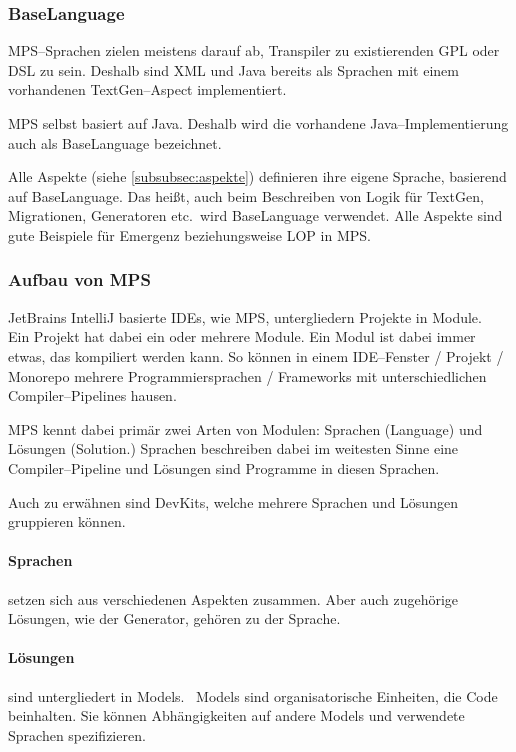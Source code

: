 \subsubsection{BaseLanguage}
\acs{MPS}--Sprachen zielen meistens darauf ab, Transpiler zu existierenden \ac{GPL} oder \ac{DSL} zu sein.
Deshalb sind \ac{XML} und Java bereits als Sprachen mit einem vorhandenen TextGen--Aspect implementiert.

\ac{MPS} selbst basiert auf Java.
Deshalb wird die vorhandene Java--Implementierung auch als BaseLanguage bezeichnet.

Alle Aspekte (siehe \autoref{subsubsec:aspekte}) definieren ihre eigene Sprache, basierend auf BaseLanguage.
Das heißt, auch beim Beschreiben von Logik für TextGen, Migrationen, Generatoren etc.\ wird BaseLanguage verwendet.
Alle Aspekte sind gute Beispiele für Emergenz beziehungsweise \ac{LOP} in \ac{MPS}.

\subsubsection{Aufbau von \acs{MPS}}
JetBrains IntelliJ basierte \acp{IDE}, wie \ac{MPS}, untergliedern Projekte in Module.~\autocite{jetbrains-sro-no-dateD}
Ein Projekt hat dabei ein oder mehrere Module.
Ein Modul ist dabei immer etwas, das kompiliert werden kann.
So können in einem \acs{IDE}--Fenster / Projekt / Monorepo mehrere Programmiersprachen / Frameworks mit unterschiedlichen Compiler--Pipelines hausen.

\ac{MPS} kennt dabei primär zwei Arten von Modulen:
Sprachen (Language) und Lösungen (Solution.)
Sprachen beschreiben dabei im weitesten Sinne eine Compiler--Pipeline und Lösungen sind Programme in diesen Sprachen.

Auch zu erwähnen sind DevKits, welche mehrere Sprachen und Lösungen gruppieren können.

\paragraph{Sprachen} setzen sich aus verschiedenen Aspekten zusammen.
Aber auch zugehörige Lösungen, wie der Generator, gehören zu der Sprache.

\paragraph{Lösungen} sind untergliedert in Models.~\autocite{jetbrains-sro-no-dateA}
Models sind organisatorische Einheiten, die Code beinhalten.
Sie können Abhängigkeiten auf andere Models und verwendete Sprachen spezifizieren.

